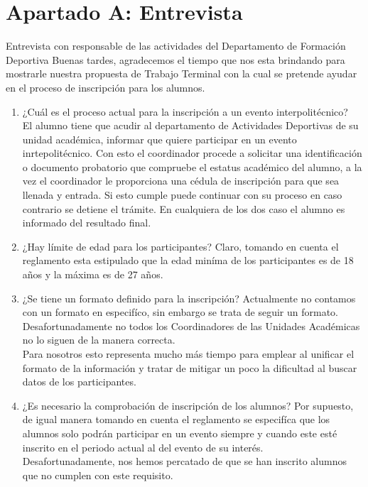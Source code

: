 \appendix
\clearpage
\addappheadtotoc
\appendixpage
	
	\chapter{Apartado A: Entrevista}
	\label{Entrevista}
	\noindent Entrevista con responsable de las actividades del Departamento de Formación Deportiva
	Buenas tardes, agradecemos el tiempo que nos esta brindando para mostrarle nuestra propuesta de Trabajo Terminal con la cual se pretende ayudar en el proceso de inscripción para los alumnos.
	
	\begin{enumerate}
		\item ¿Cuál es el proceso actual para la inscripción a un evento interpolitécnico?\\
		El alumno tiene que acudir al departamento de Actividades Deportivas de su unidad académica, informar que quiere participar en un evento inrtepolitécnico. Con esto el coordinador procede a solicitar una identificación o documento probatorio que compruebe el estatus académico del alumno, a la vez el coordinador le proporciona una cédula de inscripción para que sea llenada y entrada. Si esto cumple puede continuar con su proceso en caso contrario se detiene el trámite. En cualquiera de los dos caso el alumno es informado del resultado final.
		
		\item ¿Hay límite de edad para los participantes?
		Claro, tomando en cuenta el reglamento esta estipulado que la edad miníma de los participantes es de 18 años y la máxima es de 27 años.
		
		\item ¿Se tiene un formato definido para la inscripción?
		Actualmente no contamos con un formato en especifíco, sin embargo se trata de seguir un formato. Desafortunadamente no todos los Coordinadores de las Unidades Académicas no lo siguen de la manera correcta.\\ 
		Para nosotros esto representa mucho más tiempo para emplear al unificar el formato de la información y tratar de mitigar un poco la dificultad al buscar datos de los participantes.
		
		\item ¿Es necesario la comprobación de inscripción de los alumnos?
		Por supuesto, de igual manera tomando en cuenta el reglamento se especifíca que los alumnos solo podrán participar en un evento siempre y cuando este esté inscrito en el periodo actual al del evento de su interés.\\
		Desafortunadamente, nos hemos percatado de que se han inscrito alumnos que no cumplen con este requisito.
		

\end{enumerate}
